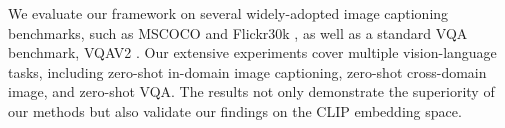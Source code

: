 We evaluate our framework on several widely-adopted image captioning benchmarks, such as MSCOCO \cite{mscoco} and Flickr30k \cite{Flickr30k}, as well as a standard VQA benchmark, VQAV2 \cite{vqav2}. Our extensive experiments cover multiple vision-language tasks, including zero-shot in-domain image captioning, zero-shot cross-domain image, and zero-shot VQA. The results not only demonstrate the superiority of our methods but also validate our findings on the CLIP embedding space.






